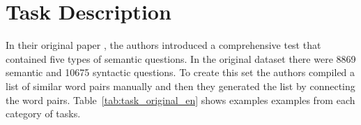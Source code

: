 










\section{Task Description}
\label{sec:task_description}



In their original paper \cite{DBLP:journals/corr/abs-1301-3781}, the authors
introduced a comprehensive test that contained five types of semantic
questions. In the original dataset  there were 8869 semantic and 10675
syntactic questions. To create this set the authors compiled a list of
similar word pairs manually and then they generated the list by
connecting the word pairs. Table~\ref{tab:task_original_en} shows examples 
examples from each category of tasks. 

